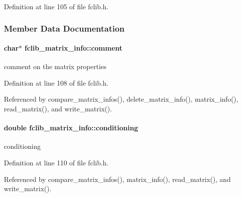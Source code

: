 Definition at line 105 of file fclib.\+h.



\subsubsection{Member Data Documentation}
\hypertarget{structfclib__matrix__info_a9c4994b1759bf3a7a75c72cd78709722}{}
\paragraph[{comment}]{\setlength{\rightskip}{0pt plus 5cm}char$\ast$ fclib\+\_\+matrix\+\_\+info\+::comment}\label{structfclib__matrix__info_a9c4994b1759bf3a7a75c72cd78709722}


comment on the matrix properties 



Definition at line 108 of file fclib.\+h.



Referenced by compare\+\_\+matrix\+\_\+infos(), delete\+\_\+matrix\+\_\+info(), matrix\+\_\+info(), read\+\_\+matrix(), and write\+\_\+matrix().

\hypertarget{structfclib__matrix__info_a453db794429411025f2b8dfb497f5f35}{}
\paragraph[{conditioning}]{\setlength{\rightskip}{0pt plus 5cm}double fclib\+\_\+matrix\+\_\+info\+::conditioning}\label{structfclib__matrix__info_a453db794429411025f2b8dfb497f5f35}


conditioning 



Definition at line 110 of file fclib.\+h.



Referenced by compare\+\_\+matrix\+\_\+infos(), matrix\+\_\+info(), read\+\_\+matrix(), and write\+\_\+matrix().

\hypertarget{structfclib__matrix__info_a9c6697aee458be4494b215f0f003ca48}{}
